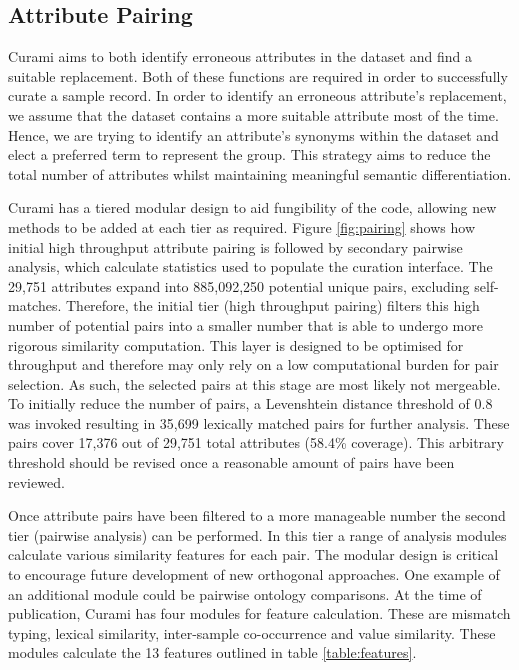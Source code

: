\documentclass{bmcart}
\begin{document}
\subsection*{Attribute Pairing}

Curami aims to both identify erroneous attributes in the dataset and find a suitable replacement. Both of these functions are required in order to successfully curate a sample record. In order to identify an erroneous attribute's replacement, we assume that the dataset contains a more suitable attribute most of the time. Hence, we are trying to identify an attribute's synonyms within the dataset and elect a preferred term to represent the group. This strategy aims to reduce the total number of attributes whilst maintaining meaningful semantic differentiation.

Curami has a tiered modular design to aid fungibility of the code, allowing new methods to be added at each tier as required. Figure \ref{fig:pairing} shows how initial high throughput attribute pairing is followed by secondary pairwise analysis, which calculate statistics used to populate the curation interface. The 29,751 attributes expand into 885,092,250 potential unique pairs, excluding self-matches. Therefore, the initial tier (high throughput pairing) filters this high number of potential pairs into a smaller number that is able to undergo more rigorous similarity computation. This layer is designed to be optimised for throughput and therefore may only rely on a low computational burden for pair selection. As such, the selected pairs at this stage are most likely not mergeable. To initially reduce the number of pairs, a Levenshtein distance \cite{levenshtein1966binary} threshold of 0.8 was invoked resulting in 35,699 lexically matched pairs for further analysis. These pairs cover 17,376 out of 29,751 total attributes (58.4\% coverage). This arbitrary threshold should be revised once a reasonable amount of pairs have been reviewed.

Once attribute pairs have been filtered to a more manageable number the second tier (pairwise analysis) can be performed. In this tier a range of analysis modules calculate various similarity features for each pair. The modular design is critical to encourage future development of new orthogonal approaches. One example of an additional module could be pairwise ontology comparisons. At the time of publication, Curami has four modules for feature calculation. These are mismatch typing, lexical similarity, inter-sample co-occurrence and value similarity. These modules calculate the 13 features outlined in table \ref{table:features}. 
\end{document}
